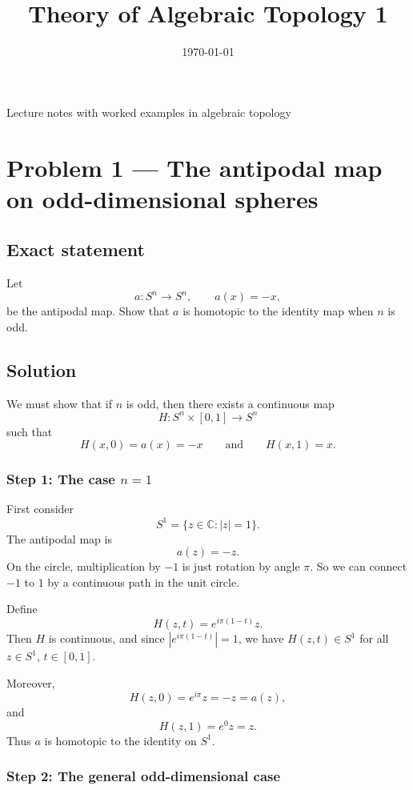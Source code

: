 \documentclass[12pt,a4paper]{article}
\title{\vspace{-1.5em}\bfseries Theory of Algebraic Topology 1}
\author{}
\date{\today}
\theoremstyle{notespace}
\begin{document}
	\maketitle
	\thispagestyle{plain}
		\begin{center}
		\begin{minipage}{0.92\textwidth}
			Lecture notes with worked examples in algebraic topology
		\end{minipage}
	\end{center}
		\tableofcontents
	\clearpage
	
\section{Problem 1 --- The antipodal map on odd-dimensional spheres}

\subsection{Exact statement}

Let
\[
a:S^n\to S^n,\qquad a(x)=-x,
\]
be the antipodal map. Show that \(a\) is homotopic to the identity map when \(n\) is odd.

\subsection{Solution}

We must show that if \(n\) is odd, then there exists a continuous map
\[
H:S^n\times [0,1]\to S^n
\]
such that
\[
H(x,0)=a(x)=-x
\qquad\text{and}\qquad
H(x,1)=x.
\]

\subsubsection{Step 1: The case \(n=1\)}

First consider
\[
S^1=\{z\in \mathbb C:|z|=1\}.
\]
The antipodal map is
\[
a(z)=-z.
\]
On the circle, multiplication by \(-1\) is just rotation by angle \(\pi\). So we can connect \(-1\) to \(1\) by a continuous path in the unit circle.

Define
\[
H(z,t)=e^{i\pi(1-t)}z.
\]
Then \(H\) is continuous, and since \(|e^{i\pi(1-t)}|=1\), we have \(H(z,t)\in S^1\) for all \(z\in S^1\), \(t\in[0,1]\).

Moreover,
\[
H(z,0)=e^{i\pi}z=-z=a(z),
\]
and
\[
H(z,1)=e^0 z=z.
\]
Thus \(a\) is homotopic to the identity on \(S^1\).

\subsubsection{Step 2: The general odd-dimensional case}
\end{document}
